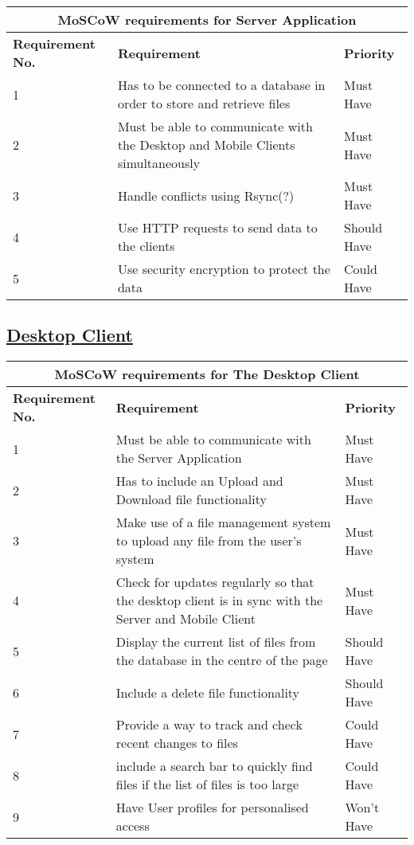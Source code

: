 \documentclass{article}
\begin{document}
\begin{tabular}{|p{4cm}|p{4cm}|p{4cm}|}
\hline
\multicolumn{3}{|c|}{\textbf{MoSCoW requirements for Server Application}} \\
\hline
\textbf{Requirement No.} & \textbf{Requirement} & \textbf{Priority}\\
\hline
1 & Has to be connected to a database in order to store and retrieve files & Must Have \\
\hline
2 & Must be able to communicate with the Desktop and Mobile Clients simultaneously & Must Have \\
\hline
3 & Handle conflicts using Rsync(?) & Must Have \\
\hline
4 & Use HTTP requests to send data to the clients & Should Have \\
\hline
5 & Use security encryption to protect the data & Could Have\\
\hline
\end{tabular}

\subsection{\underline{Desktop Client}}

\begin{tabular}{|p{4cm}|p{4cm}|p{4cm}|}
\hline
\multicolumn{3}{|c|}{\textbf{MoSCoW requirements for The Desktop Client}} \\
\hline
\textbf{Requirement No.} & \textbf{Requirement} & \textbf{Priority}\\
\hline
1 & Must be able to communicate with the Server Application & Must Have \\
\hline
2 & Has to include an Upload and Download file functionality & Must Have \\
\hline
3 & Make use of a file management system to upload any file from the user's system & Must Have \\
\hline
4 & Check for updates regularly so that the desktop client is in sync with the Server and Mobile Client & Must Have\\
\hline
5 & Display the current list of files from the database in the centre of the page & Should Have \\
\hline
6 & Include a delete file functionality   & Should Have \\
\hline
7 & Provide a way to track and check recent changes to files & Could Have\\
\hline
8 & include a search bar to quickly find files if the list of files is too large & Could Have \\
\hline
9 & Have User profiles for personalised access & Won't Have \\
\hline
\end{tabular}
\end{document}
